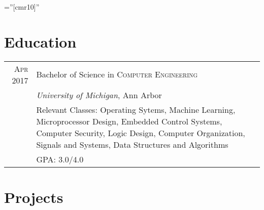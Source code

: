 \documentclass[a4paper,11pt]{article} %
\begin{document}
\pagestyle{empty} %

\font\fb=''[cmr10]'' %


\par{\par} %
\par{\par}


\section{Education}

\begin{tabular}{r|p{12cm}}
\hspace{4pt}\textsc{Apr} 2017 & Bachelor of Science in \textsc{Computer Engineering} \\
& \normalsize\emph{University of Michigan}, Ann Arbor \\
& \footnotesize{Relevant Classes: Operating Sytems, Machine Learning,
  Microprocessor Design, Embedded Control Systems, Computer Security,
  Logic Design, Computer Organization, Signals and Systems,
  Data Structures and Algorithms}\\
& \footnotesize{GPA: 3.0/4.0} \\
\end{tabular}


\section{Projects}
\end{document}
